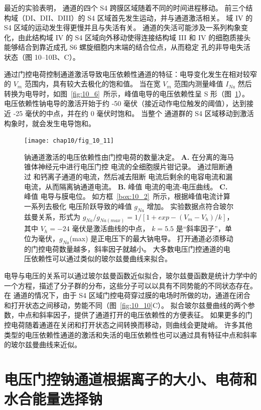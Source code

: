 最近的实验表明， 通道的四个 S4 跨膜区域随着不同的时间进程移动。 
前三个结构域（DI、DII、DIII）的 S4 区域首先发生运动，并与通道激活相关。 
域 IV 的 S4 区域的运动发生得更慢并且与失活有关。 
 通道的失活可能涉及一系列构象变化，由此结构域 IV 的 S4 区域向外移动使得连接结构域 III 和 IV 的细胞质接头能够结合到靠近成孔 S6 螺旋细胞内末端的结合位点，从而稳定 孔的非导电失活状态（图 10–10B、C）。


通过门控电荷控制通道激活导致电压依赖性通道的特征：电导变化发生在相对较窄的 $V_m$ 范围内，具有较大去极化的饱和值。
当在宽 $V_m$ 范围内测量峰值 $I_{Na}$ 然后转换为电导时，如图~\ref{fig:10_6}~所示，峰值电导的电压依赖性呈 S 形（图~\ref{fig:10_11}）。
电压依赖性钠电导的激活开始于约 -50 毫伏（接近动作电位触发的阈值），达到接近 -25 毫伏的中点，并在约 0 毫伏时饱和。 
当整个  通道群的 S4 区域移动到激活构象时，就会发生电导饱和。


\begin{figure}[htbp]
	\centering
	\texttt{[image: chap10/fig\_10\_11]}
	\caption{钠通道激活的电压依赖性由门控电荷的数量决定。
		\textbf{A.} 在分离的海马锥体神经元中进行电压门控  电流的全细胞膜片钳记录。
		通过阻断通过  和钙离子通道的电流，然后减去阻断  电流后剩余的电容电流和漏电流，从而隔离钠通道电流。
		\textbf{B.} 峰值  电流的电流-电压曲线。
		\textbf{C.} 峰值  电导与膜电位。 如方框~\ref{box:10_2}~所示，根据峰值电流计算一系列去极化
		电压阶跃导致的峰值 $g_{Na}$ 增加。
		实验数据点符合玻尔兹曼关系，形式为 $g_{Na} / g_{Na(max)} = 1 / [1 + exp - (V_m - V_h) / k]$，其中 $V_h = −24$ 毫伏是激活曲线的中点， $k = 5.5$ 是“斜率因子”，单位为毫伏，$g_{Na}$(max) 是正电压下的最大钠电导。
		打开通道必须移动的门控电荷数量越多，斜率因子就越小。
		大多数电压门控通道的电压依赖性可以通过类似的玻尔兹曼曲线来拟合。}
	\label{fig:10_11}
\end{figure}


电导与电压的关系可以通过玻尔兹曼函数近似拟合，玻尔兹曼函数是统计力学中的一个方程，描述了分子群的分布，这些分子可以以具有不同势能的不同状态存在。
在  通道的情况下，由于 S4 区域门控电荷穿过膜的电场时所做的功，通道在闭合和打开状态之间移动，势能不同（图~\ref{fig:10_10}C）。
拟合玻尔兹曼曲线的两个参数，中点和斜率因子，提供了通道打开的电压依赖性的方便表征。
如果更多的门控电荷随着通道在关闭和打开状态之间转换而移动，则曲线会更陡峭。
许多其他类型的电压依赖性通道的激活和失活的电压依赖性也可以通过具有特征中点和斜率的玻尔兹曼曲线来近似。


\section{电压门控钠通道根据离子的大小、电荷和水合能量选择钠}

